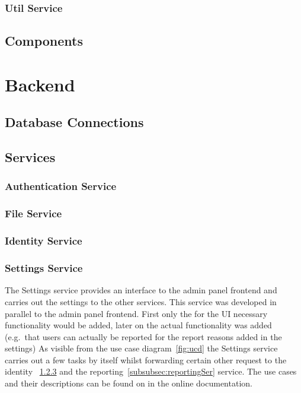 \subsubsection{Util Service}

\subsection{Components}

\section{Backend}

\subsection{Database Connections}

\subsection{Services}

\subsubsection{Authentication Service}

\subsubsection{File Service}

\subsubsection{Identity Service}
\label{subsubsec:identitySer}

\subsubsection{Settings Service}
\label{subsubsec:settingsSer}
The Settings service provides an interface to the admin panel frontend and carries out the settings to the other services.
This service was developed in parallel to the admin panel frontend. %
First only the for the UI necessary functionality would be added, later on the actual functionality was added (e.g.\ that users can actually be reported for the report reasons added in the settings)
As visible from the use case diagram~\ref{fig:ucd} the Settings service carries out a few tasks by itself whilst forwarding
certain other request to the identity ~\ref{subsubsec:identitySer} and the reporting~\ref{subsubsec:reportingSer} service.
The use cases and their descriptions can be found on in the online documentation.

